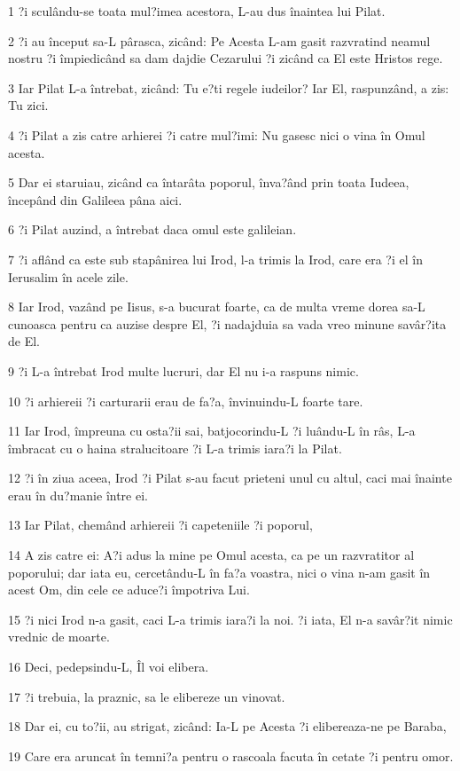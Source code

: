 \par 1 ?i sculându-se toata mul?imea acestora, L-au dus înaintea lui Pilat.
\par 2 ?i au început sa-L pârasca, zicând: Pe Acesta L-am gasit razvratind neamul nostru ?i împiedicând sa dam dajdie Cezarului ?i zicând ca El este Hristos rege.
\par 3 Iar Pilat L-a întrebat, zicând: Tu e?ti regele iudeilor? Iar El, raspunzând, a zis: Tu zici.
\par 4 ?i Pilat a zis catre arhierei ?i catre mul?imi: Nu gasesc nici o vina în Omul acesta.
\par 5 Dar ei staruiau, zicând ca întarâta poporul, înva?ând prin toata Iudeea, începând din Galileea pâna aici.
\par 6 ?i Pilat auzind, a întrebat daca omul este galileian.
\par 7 ?i aflând ca este sub stapânirea lui Irod, l-a trimis la Irod, care era ?i el în Ierusalim în acele zile.
\par 8 Iar Irod, vazând pe Iisus, s-a bucurat foarte, ca de multa vreme dorea sa-L cunoasca pentru ca auzise despre El, ?i nadajduia sa vada vreo minune savâr?ita de El.
\par 9 ?i L-a întrebat Irod multe lucruri, dar El nu i-a raspuns nimic.
\par 10 ?i arhiereii ?i carturarii erau de fa?a, învinuindu-L foarte tare.
\par 11 Iar Irod, împreuna cu osta?ii sai, batjocorindu-L ?i luându-L în râs, L-a îmbracat cu o haina stralucitoare ?i L-a trimis iara?i la Pilat.
\par 12 ?i în ziua aceea, Irod ?i Pilat s-au facut prieteni unul cu altul, caci mai înainte erau în du?manie între ei.
\par 13 Iar Pilat, chemând arhiereii ?i capeteniile ?i poporul,
\par 14 A zis catre ei: A?i adus la mine pe Omul acesta, ca pe un razvratitor al poporului; dar iata eu, cercetându-L în fa?a voastra, nici o vina n-am gasit în acest Om, din cele ce aduce?i împotriva Lui.
\par 15 ?i nici Irod n-a gasit, caci L-a trimis iara?i la noi. ?i iata, El n-a savâr?it nimic vrednic de moarte.
\par 16 Deci, pedepsindu-L, Îl voi elibera.
\par 17 ?i trebuia, la praznic, sa le elibereze un vinovat.
\par 18 Dar ei, cu to?ii, au strigat, zicând: Ia-L pe Acesta ?i elibereaza-ne pe Baraba,
\par 19 Care era aruncat în temni?a pentru o rascoala facuta în cetate ?i pentru omor.
